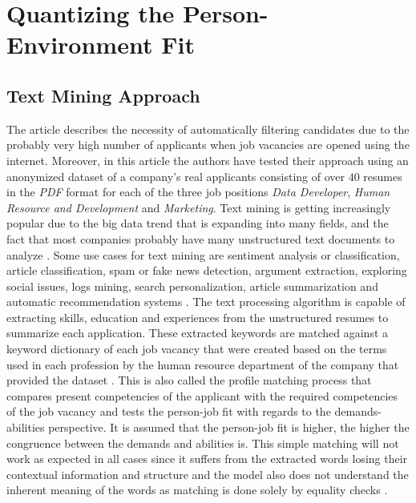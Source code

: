 \documentclass[draft,final]{thesisclass} %
\begin{document}
\section{Quantizing the Person-Environment Fit}

\subsection{Text Mining Approach} \label{text_mining_approach}
The article \textcite{text_mining_for_automatic_profiling} describes the necessity of automatically filtering candidates due to the probably very high number of applicants when job vacancies are opened using the internet.
Moreover, in this article the authors have tested their approach using an anonymized dataset of a company's real applicants consisting of over $40$ resumes in the \textit{PDF} format for each of the three job positions \textit{Data Developer}, \textit{Human Resource and Development} and \textit{Marketing}.
Text mining is getting increasingly popular due to the big data trend that is expanding into many fields, and the fact that most companies probably have many unstructured text documents to analyze \parencite[49]{text_mining_for_automatic_profiling}.
Some use cases for text mining are sentiment analysis or classification, article classification, spam or fake news detection, argument extraction, exploring social issues, logs mining, search personalization, article summarization and automatic recommendation systems \parencite[49]{text_mining_for_automatic_profiling}.
The text processing algorithm is capable of extracting skills, education and experiences from the unstructured resumes to summarize each application.
These extracted keywords are matched against a keyword dictionary of each job vacancy that were created based on the terms used in each profession by the human resource department of the company that provided the dataset \parencite[47]{text_mining_for_automatic_profiling}.
This is also called the profile matching process that compares present competencies of the applicant with the required competencies of the job vacancy and tests the person-job fit with regards to the demands-abilities perspective.
It is assumed that the person-job fit is higher, the higher the congruence between the demands and abilities is.
This simple matching will not work as expected in all cases since it suffers from the extracted words losing their contextual information and structure and the model also does not understand the inherent meaning of the words as matching is done solely by equality checks \parencite[517]{applicant_semantic_matching}.
\end{document}
